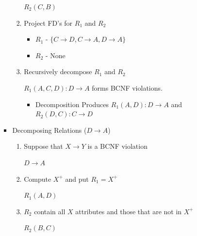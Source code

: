 \documentclass[12pt]{article}
\begin{document}
\begin{enumerate}[1.]
\begin{enumerate}[a)]
\begin{itemize}
\begin{enumerate}[1.]
                \color{red}
                $R_2(C,B)$
                \color{black}

                \item Project FD's for $R_1$ and $R_2$

                \bigskip

                \begin{itemize}
                    \item $R_1$ - \color{red}$\{C \to D, C \to A, D \to A \}$\color{black}
                    \item $R_2$ - \color{red}None\color{black}

                \end{itemize}
                \item Recursively decompose $R_1$ and $R_2$

                \bigskip

                \color{red}$R_1(A,C,D):D \to A$ forms BCNF violations.\color{black}

                \bigskip

                \begin{itemize}
                    \item \color{red}Decomposition Produces $R_1 (A,D): D \to A$ and $R_2 (D,C):C \to D$\color{black}
                \end{itemize}


            \end{enumerate}

            \item Decomposing Relations ($D \to A$)

            \begin{enumerate}[1.]
                \item Suppose that $X \to Y$ is a BCNF violation

                \color{red}
                $D \to A$
                \color{black}

                \item Compute $X^+$ and put $R_1 = X^+$

                \color{red}
                $R_1(A,D)$
                \color{black}

                \item $R_2$ contain all $X$ attributes and those that are not in $X^+$

                \color{red}
                $R_2(B,C)$
                \color{black}


\end{enumerate}
\end{itemize}
\end{enumerate}
\end{enumerate}
\end{document}
